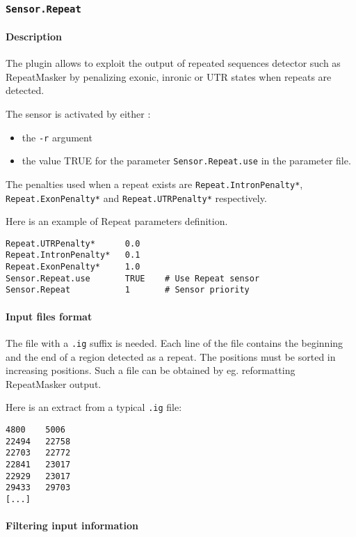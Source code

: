 
\subsubsection{\texttt{Sensor.Repeat}}

\paragraph{Description}

The plugin allows to exploit the output of repeated sequences detector
such as RepeatMasker by penalizing exonic, inronic or UTR states when
repeats are detected.

The sensor is activated by either :
\begin{itemize}
\item the \texttt{-r} argument 
\item the value TRUE for the parameter \texttt{Sensor.Repeat.use} in the
  parameter file.
\end{itemize}
The penalties used when a repeat exists are \texttt{Repeat.IntronPenalty*},
\texttt{Repeat.ExonPenalty*} and \texttt{Repeat.UTRPenalty*}
respectively.

Here is an example of Repeat parameters definition.
\begin{Verbatim}[fontsize=\small]
Repeat.UTRPenalty*      0.0
Repeat.IntronPenalty*   0.1
Repeat.ExonPenalty*     1.0
Sensor.Repeat.use       TRUE    # Use Repeat sensor
Sensor.Repeat           1       # Sensor priority
\end{Verbatim}

\paragraph{Input files format}

The file with a \texttt{.ig} suffix is needed. Each line of the file
contains the beginning and the end of a region detected as a
repeat. The positions must be sorted in increasing positions. Such a
file can be obtained by eg. reformatting RepeatMasker output.

Here is an extract from a typical \texttt{.ig} file:
\begin{Verbatim}[fontsize=\small]
4800    5006
22494   22758
22703   22772
22841   23017
22929   23017
29433   29703
[...]
\end{Verbatim}

\paragraph{Filtering input information}

